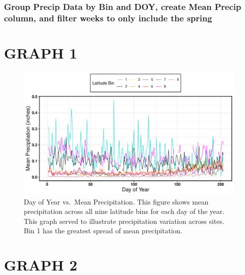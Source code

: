 \documentclass[12pt,]{article}
\begin{document}
\hypertarget{group-precip-data-by-bin-and-doy-create-mean-precip-column-and-filter-weeks-to-only-include-the-spring}{%
\subsubsection{Group Precip Data by Bin and DOY, create Mean Precip
column, and filter weeks to only include the
spring}\label{group-precip-data-by-bin-and-doy-create-mean-precip-column-and-filter-weeks-to-only-include-the-spring}}

\hypertarget{graph-1}{%
\section{GRAPH 1}\label{graph-1}}

\begin{figure}
\centering
\includegraphics{Project_Report_v2_files/figure-latex/unnamed-chunk-2-1.pdf}
\caption{Day of Year vs.~Mean Precipitation. This figure shows mean
precipitation across all nine latitude bins for each day of the year.
This graph served to illustrate precipitation variation across sites.
Bin 1 has the greatest spread of mean precipitation.}
\end{figure}

\hypertarget{graph-2}{%
\section{GRAPH 2}\label{graph-2}}
\end{document}
